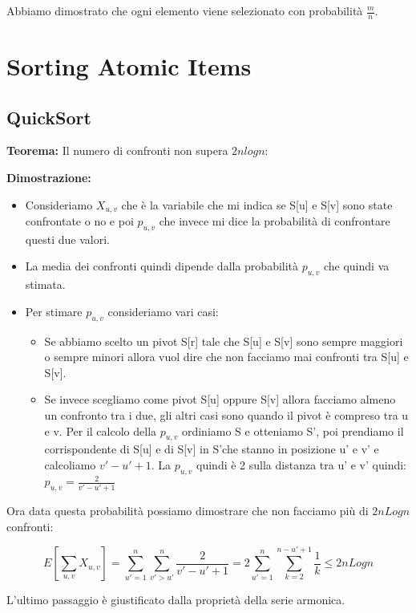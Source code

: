 \documentclass[12pt]{article}
\begin{document}
Abbiamo dimostrato che ogni elemento viene selezionato con probabilità $\frac{m}{n}$.

\section{Sorting Atomic Items}

\subsection{QuickSort}

\textbf{Teorema:} Il numero di confronti non supera $2nlogn$:

\textbf{Dimostrazione:}
\begin{itemize}
    \item Consideriamo $X_{u,v}$ che è la variabile che mi indica se S[u] e S[v] sono state confrontate o no e poi $p_{u,v}$ che invece mi dice la probabilità di confrontare questi due valori.
    \item La media dei confronti quindi dipende dalla probabilità $p_{u,v}$ che quindi va stimata.
    \item Per stimare $p_{u,v}$ consideriamo vari casi:
        \begin{itemize}
            \item Se abbiamo scelto un pivot S[r] tale che S[u] e S[v] sono sempre maggiori o sempre minori allora vuol dire che non facciamo mai confronti tra S[u] e S[v].
            \item Se invece scegliamo come pivot S[u] oppure S[v] allora facciamo almeno un confronto tra i due, gli altri casi sono quando il pivot è compreso tra u e v.
            Per il calcolo della $p_{u,v}$ ordiniamo S e otteniamo S', poi prendiamo il corrispondente di S[u] e di S[v] in S'che stanno in posizione u' e v' e calcoliamo $v'-u'+1$.
            La $p_{u,v}$ quindi è 2 sulla distanza tra u' e v' quindi: $p_{u,v} = \frac{2}{v'-u'+1}$ 
        \end{itemize}
\end{itemize}
Ora data questa probabilità possiamo dimostrare che non facciamo più di $2nLogn$ confronti:

\begin{equation}
    E[\sum_{u,v}X_{u,v}] = \sum_{u'=1}^{n} \sum_{v'>u'}^{n} \frac{2}{v'-u'+1} = 2 \sum_{u'=1}^{n} \sum_{k=2}^{n-u'+1} \frac{1}{k} \leq 2nLogn
\end{equation}

L'ultimo passaggio è giustificato dalla proprietà della serie armonica. \\
\end{document}
